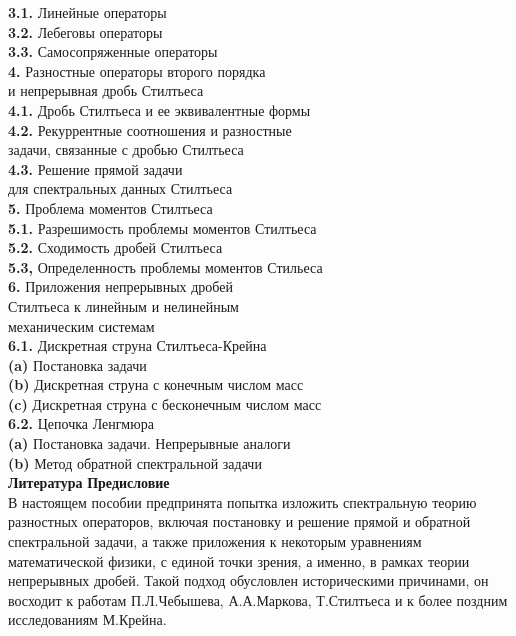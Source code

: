 \documentclass[12pt,a4paper]{article}
\theoremstyle{plain}   \newtheorem{Pro}{Задача}
\begin{document}
{\bfseries 3.1.}
Линейные операторы \\
{\bfseries 3.2.}
Лебеговы операторы \\
{\bfseries 3.3.}
Самосопряженные операторы
$$ \; $$
{\Large \bfseries 4.}
Разностные операторы второго порядка \\
и непрерывная дробь Стилтьеса \\
{\bfseries 4.1.}
Дробь Стилтьеса и ее эквивалентные формы \\
{\bfseries 4.2.}
Рекуррентные соотношения и разностные \\
задачи, связанные с дробью Стилтьеса \\
{\bfseries 4.3.}
Решение прямой задачи \\
для спектральных данных Стилтьеса
$$ \; $$
{\Large \bfseries 5.}
Проблема моментов Стилтьеса \\
{\bfseries 5.1.}
Разрешимость проблемы моментов Стилтьеса \\
{\bfseries 5.2.}
Сходимость дробей Стилтьеса \\
{\bfseries 5.3,}
Определенность проблемы моментов Стильеса
$$ \; $$
{\Large \bfseries 6.}
Приложения непрерывных дробей \\
Стилтьеса к линейным и нелинейным \\
механическим системам \\
{\bfseries 6.1.}
Дискретная струна Стилтьеса-Крейна \\
{\bfseries (a)}
Постановка задачи \\
{\bfseries (b)}
Дискретная струна с конечным числом масс \\
{\bfseries (c)}
Дискретная струна с бесконечным числом масс \\
{\bfseries 6.2.}
Цепочка Ленгмюра \\
{\bfseries (a)}
Постановка задачи. Непрерывные аналоги \\
{\bfseries (b)}
Метод обратной спектральной задачи
$$ \; $$
{\bfseries Литература}
\newpage
{\Large \bfseries Предисловие} \\

В настоящем пособии предпринята попытка изложить спектральную
теорию разностных операторов, включая постановку и решение
прямой и обратной спектральной задачи, а также приложения к
некоторым уравнениям математической физики, с единой точки зрения,
а именно, в рамках теории непрерывных дробей.
Такой подход обусловлен историческими причинами, он восходит к
работам П.Л.Чебышева, А.А.Маркова, Т.Стилтьеса и к более поздним
исследованиям М.Крейна. \\
\end{document}
